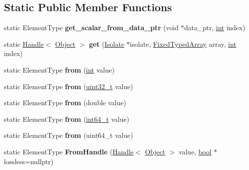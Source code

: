 \subsection*{Static Public Member Functions}
\begin{DoxyCompactItemize}
\item 
\mbox{\label{classv8_1_1internal_1_1FixedTypedArray_a49828d8e1ce5ca82c470186a582e1824}} 
static Element\+Type {\bfseries get\+\_\+scalar\+\_\+from\+\_\+data\+\_\+ptr} (void $\ast$data\+\_\+ptr, \mbox{\hyperlink{classint}{int}} index)
\item 
\mbox{\label{classv8_1_1internal_1_1FixedTypedArray_afdd8f7ea6104bf29f8136c0cdb4a156c}} 
static \mbox{\hyperlink{classv8_1_1internal_1_1Handle}{Handle}}$<$ \mbox{\hyperlink{classv8_1_1internal_1_1Object}{Object}} $>$ {\bfseries get} (\mbox{\hyperlink{classv8_1_1internal_1_1Isolate}{Isolate}} $\ast$isolate, \mbox{\hyperlink{classv8_1_1internal_1_1FixedTypedArray}{Fixed\+Typed\+Array}} array, \mbox{\hyperlink{classint}{int}} index)
\item 
\mbox{\label{classv8_1_1internal_1_1FixedTypedArray_a206009dbd02420a9630e4230a0e732f6}} 
static Element\+Type {\bfseries from} (\mbox{\hyperlink{classint}{int}} value)
\item 
\mbox{\label{classv8_1_1internal_1_1FixedTypedArray_af8c978534aeb4c1934aac89413091797}} 
static Element\+Type {\bfseries from} (\mbox{\hyperlink{classuint32__t}{uint32\+\_\+t}} value)
\item 
\mbox{\label{classv8_1_1internal_1_1FixedTypedArray_acb3e3b250074f4c0d50683ade92a8d5d}} 
static Element\+Type {\bfseries from} (double value)
\item 
\mbox{\label{classv8_1_1internal_1_1FixedTypedArray_a0354392568afdb9174967c7d720e68f5}} 
static Element\+Type {\bfseries from} (\mbox{\hyperlink{classint64__t}{int64\+\_\+t}} value)
\item 
\mbox{\label{classv8_1_1internal_1_1FixedTypedArray_a07b9d4ef73301b9e78edc4267f84ab44}} 
static Element\+Type {\bfseries from} (uint64\+\_\+t value)
\item 
\mbox{\label{classv8_1_1internal_1_1FixedTypedArray_ad6a76295a554ade4fab60d5955164ed3}} 
static Element\+Type {\bfseries From\+Handle} (\mbox{\hyperlink{classv8_1_1internal_1_1Handle}{Handle}}$<$ \mbox{\hyperlink{classv8_1_1internal_1_1Object}{Object}} $>$ value, \mbox{\hyperlink{classbool}{bool}} $\ast$lossless=nullptr)
\end{DoxyCompactItemize}
